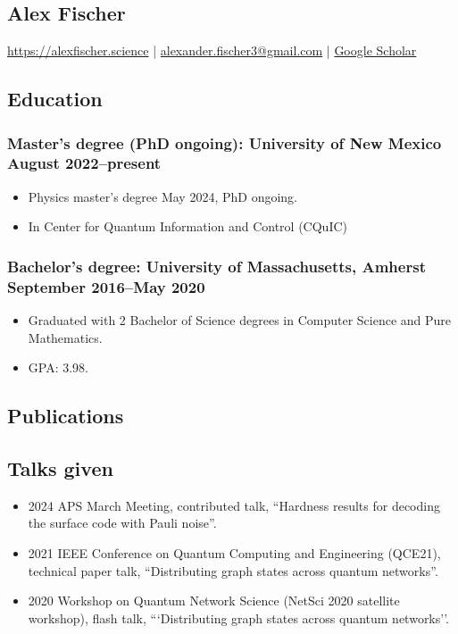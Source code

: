 \documentclass{article}
\begin{document}
	\begin{center}
		\section*{Alex Fischer}
			\href{https://alexfischer.science}{https://alexfischer.science} |
				\href{mailto:alexander.fischer3@gmail.com}{alexander.fischer3@gmail.com} | \href{https://scholar.google.com/citations?user=CfhWaI4AAAAJ}{Google Scholar}
    \end{center}
	\subsection*{Education}
		\subsubsection*{Master's degree (PhD ongoing): University of New Mexico \hfill \normalfont \normalsize August 2022--present}
			\begin{itemize}
				\item Physics master's degree May 2024, PhD ongoing.
				\item In Center for Quantum Information and Control (CQuIC)
			\end{itemize}
		\subsubsection*{Bachelor's degree: University of Massachusetts, Amherst \hfill \normalfont \normalsize September 2016--May 2020}
			\begin{itemize}
				\item Graduated with 2 Bachelor of Science degrees in Computer Science and Pure Mathematics.
				\item GPA: 3.98.
			\end{itemize}
	\subsection*{Publications}
		\nocite{*}
		
		{}
	\subsection*{Talks given}
		\begin{itemize}
			\item 2024 APS March Meeting, contributed talk, ``Hardness results for decoding the surface code with Pauli noise''.
			\item 2021 IEEE Conference on Quantum Computing and Engineering (QCE21), technical paper talk, ``Distributing graph states across quantum networks''.
			\item 2020 Workshop on Quantum Network Science (NetSci 2020 satellite workshop), flash talk, ```Distributing graph states across quantum networks''.
		\end{itemize}
\end{document}
